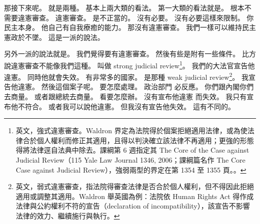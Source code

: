 \hypertarget{w01:cue:433}{}那接下來呢。
\hypertarget{w01:cue:434}{}就是兩種。
\hypertarget{w01:cue:435}{}基本上兩大類的看法。
\hypertarget{w01:cue:436}{}第一大類的看法就是。
\hypertarget{w01:cue:437}{}根本不需要違憲審查。
\hypertarget{w01:cue:438}{}違憲審查。
\hypertarget{w01:cue:439}{}是不正當的。
\hypertarget{w01:cue:440}{}沒有必要。
\hypertarget{w01:cue:441}{}沒有必要這樣來限制。
\hypertarget{w01:cue:442}{}你民主本身。
\hypertarget{w01:cue:443}{}他自己有自我療癒的能力。
\hypertarget{w01:cue:444}{}那沒有違憲審查。
\hypertarget{w01:cue:445}{}我們一樣可以維持民主憲政於不墜。
\hypertarget{w01:cue:446}{}這是一派的說法。

\hypertarget{w01:cue:447}{}另外一派的說法就是。
\hypertarget{w01:cue:448}{}我們覺得要有違憲審查。
\hypertarget{w01:cue:449}{}然後有些是附有一些條件。
\hypertarget{w01:cue:450}{}比方說違憲審查不能像我們這種。
\hypertarget{w01:cue:451}{}叫做 strong judicial review\footnote{英文，強式違憲審查。Waldron 界定為法院得於個案拒絕適用法律，或為使法律合於個人權利而修正其適用，且得以判決確立該法律不再適用；更強的形態得將法律逕自法典中除去。課綱第 6 週指定其 The Core of the Case against Judicial Review（115 Yale Law Journal 1346, 2006；課綱篇名作 The Core Case against Judicial Review），強弱兩型的界定在第 1354 至 1355 頁。\cite{waldron2006}。}。
\hypertarget{w01:cue:452}{}我們的大法官宣告他違憲。
\hypertarget{w01:cue:453}{}同時他就會失效。
\hypertarget{w01:cue:454}{}有非常多的國家。
\hypertarget{w01:cue:455}{}是那種 weak judicial review\footnote{英文，弱式違憲審查，指法院得審查法律是否合於個人權利，但不得因此拒絕適用或調整其適用。Waldron 舉英國為例：法院依 Human Rights Act 得作成法律與公約權利不符的宣告（declaration of incompatibility），該宣告不影響法律的效力、繼續施行與執行。}。
\hypertarget{w01:cue:456}{}我宣告他違憲。
\hypertarget{w01:cue:457}{}然後這個案子呢。
\hypertarget{w01:cue:458}{}要怎麼處理。
\hypertarget{w01:cue:459}{}政治部門
\hypertarget{w01:cue:460}{}必反應。
\hypertarget{w01:cue:461}{}你們跟內閣你們去商量。
\hypertarget{w01:cue:462}{}或者跟總統去商量。
\hypertarget{w01:cue:463}{}看要怎麼辦。
\hypertarget{w01:cue:464}{}沒有宣布他違憲
\hypertarget{w01:cue:465}{}而失效。
\hypertarget{w01:cue:466}{}我只有宣布他不符合。
\hypertarget{w01:cue:467}{}或者我可以說他違憲。
\hypertarget{w01:cue:468}{}但我沒有宣告他失效。
\hypertarget{w01:cue:469}{}這有不同的。

